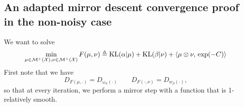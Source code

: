 \documentclass[a4paper, 10pt]{article}
\begin{document}
\subsection{An adapted mirror descent convergence proof in the non-noisy case}


We want to solve
\begin{equation}
    \min_{\mu \in \mathcal{M}^+(\mathcal{X}), \nu \in \mathcal{M}^+(\mathcal{X})} 
    F(\mu, \nu) \triangleq \text{KL}(\alpha | \mu) + \text{KL}(\beta | \nu) + \langle \mu \otimes \nu,\,\exp(-C)\rangle
\end{equation}
First note that we have
\begin{equation}
    D_{F(\mu, \cdot)} = D_{\omega_\alpha(\cdot)}\qquad D_{F(\cdot, \nu)} = D_{w_\beta(\cdot)},
\end{equation}
so that at every iteration, we perform a mirror step with a function that is 1-relatively smooth.
\end{document}
